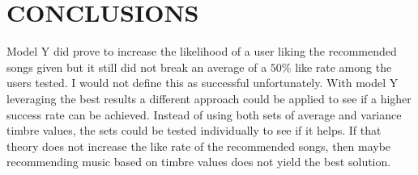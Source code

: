 \documentclass[letterpaper, 10 pt, conference]{ieeeconf}
\begin{document}

\section{CONCLUSIONS}

Model Y did prove to increase the likelihood of a user liking the recommended songs given but it still did not break an average of a $50\%$ like rate among the users tested. I would not define this as successful unfortunately. With model Y leveraging the best results a different approach could be applied to see if a higher success rate can be achieved. Instead of using both sets of average and variance timbre values, the sets could be tested individually to see if it helps. If that theory does not increase the like rate of the recommended songs, then maybe recommending music based on timbre values does not yield the best solution.

\addtolength{\textheight}{-12cm}   %




\end{document}
